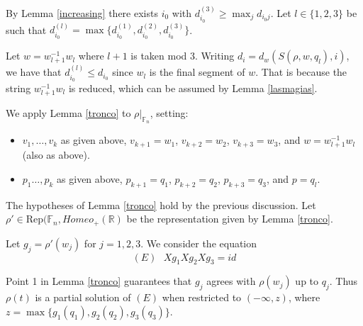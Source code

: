 \documentclass[12pt]{article}
\newcommand{\F}{\mathbb{F}}
\newcommand{\R}{\mathbb{R}}
\theoremstyle{definition}
\begin{document}
By Lemma \ref{increasing} there exists $i_0$ with $d_{i_0}^{(3)}\geq\max_j d_{i_0j}$. Let $l\in\{1,2,3\}$ be such that $d_{i_0}^{(l)}=\max\{d_{i_0}^{(1)},d_{i_0}^{(2)},d_{i_0}^{(3)}\}$.

Let $w=w_{l+1}^{-1}w_l$ where $l+1$ is taken mod 3. Writing $d_i=d_w(S(\rho,w,q_l),i)$, we have that $d^{(l)}_{i_0}\leq d_{i_0}$ since $w_l$ is the final segment of $w$. That is because the string $w_{l+1}^{-1}w_l$ is reduced, which can be assumed by Lemma \ref{lasmagias}. 


We apply Lemma \ref{tronco} to $\rho|_{\F_n}$, setting:
\begin{itemize}
\item $v_1,\ldots,v_k$ as given above, $v_{k+1}=w_1$, $v_{k+2}=w_2$, $v_{k+3}=w_3$, and $w=w_{l+1}^{-1}w_l$ (also as above).
\item $p_1\ldots,p_k$ as given above, $p_{k+1}=q_1$, $p_{k+2}=q_2$, $p_{k+3}=q_3$, and $p=q_l$.
\end{itemize}
The hypotheses of Lemma \ref{tronco} hold by the previous discussion. Let $\rho'\in\text{Rep}(\F_n,Homeo_{+}(\R)$ be the representation given by Lemma \ref{tronco}.



Let $g_j=\rho'(w_j)$ for $j=1,2,3$. We consider the equation 
$$(E) \ \ \ Xg_1Xg_2Xg_3=id $$

Point 1 in Lemma \ref{tronco} guarantees that $g_j$ agrees with $\rho(w_j)$ up to $q_j$. Thus $\rho(t)$ is a partial solution of $(E)$ when restricted to $(-\infty,z)$, where 
$z=\max\{g_1(q_1),g_2(q_2),g_3(q_3)\}$.  

\end{document}
